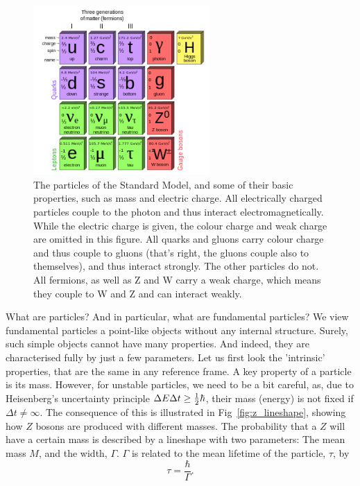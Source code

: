 \begin{figure}
\includegraphics[width=0.6\textwidth]{fig/TheSM}
\caption{The particles of the Standard Model, and some of their basic properties, such as mass and electric charge. All electrically charged particles couple to the photon and thus interact electromagnetically. While the electric charge is given, the colour charge and weak charge are omitted in this figure. All quarks and gluons carry colour charge and thus couple to gluons (that's right, the gluons couple also to themselves), and thus interact strongly. The other particles do not. All fermions, as well as Z and W carry a weak charge, which means they couple to W and Z and can interact weakly.\label{fig:SM}}
\end{figure}


What are particles? And in particular, what are fundamental particles? We view fundamental particles a point-like objects without any internal structure. Surely, such simple objects cannot have many properties. And indeed, they are characterised fully by just a few parameters. Let us first look the 'intrinsic' properties, that are the same in any reference frame. A key property of a particle is its mass. However, for unstable particles, we need to be a bit careful, as, due to Heisenberg's uncertainty principle $\Delta E\Delta t \ge \frac{1}{2} \hbar$, their mass (energy) is not fixed if $\Delta t \neq \infty$. The consequence of this is illustrated in Fig~\ref{fig:z_lineshape}, showing how $Z$ bosons are produced with different masses. The probability that a $Z$ will have a certain mass is described by a lineshape with two parameters: The mean mass $M$, and the width, $\Gamma$. $\Gamma$ is related to the mean lifetime of the particle, $\tau$, by 
\begin{equation}
    \tau = \frac{\hbar}{\Gamma}.
\end{equation}

